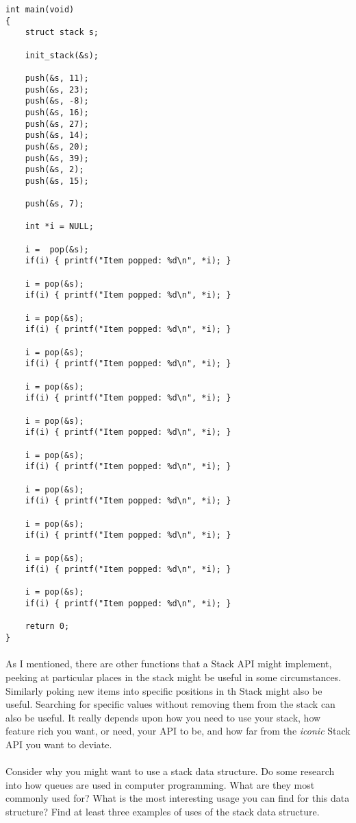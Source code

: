 \documentclass[10pt, a4paper, twosize]{article}
\begin{document}
\begin{lstlisting}
int main(void)
{
    struct stack s;

    init_stack(&s);

    push(&s, 11);
    push(&s, 23);
    push(&s, -8);
    push(&s, 16);
    push(&s, 27);
    push(&s, 14);
    push(&s, 20);
    push(&s, 39);
    push(&s, 2);
    push(&s, 15);
    
    push(&s, 7);

    int *i = NULL;

    i =  pop(&s);
    if(i) { printf("Item popped: %d\n", *i); }

    i = pop(&s);
    if(i) { printf("Item popped: %d\n", *i); }

    i = pop(&s);
    if(i) { printf("Item popped: %d\n", *i); }
    
    i = pop(&s);
    if(i) { printf("Item popped: %d\n", *i); }

    i = pop(&s);
    if(i) { printf("Item popped: %d\n", *i); }

    i = pop(&s);
    if(i) { printf("Item popped: %d\n", *i); }

    i = pop(&s);
    if(i) { printf("Item popped: %d\n", *i); }

    i = pop(&s);
    if(i) { printf("Item popped: %d\n", *i); }

    i = pop(&s);
    if(i) { printf("Item popped: %d\n", *i); }

    i = pop(&s);
    if(i) { printf("Item popped: %d\n", *i); }

    i = pop(&s);
    if(i) { printf("Item popped: %d\n", *i); }

    return 0;
}
\end{lstlisting}

\paragraph{} As I mentioned, there are other functions that a Stack API might implement, peeking at particular places in the stack might be useful in some circumstances. Similarly poking new items into specific positions in th Stack might also be useful. Searching for specific values without removing them from the stack can also be useful. It really depends upon how you need to use your stack, how feature rich you want, or need, your API to be, and how far from the \emph{iconic} Stack API you want to deviate.


\paragraph{} Consider why you might want to use a stack data structure. Do some research into how queues are used in computer programming. What are they most commonly used for? What is the most interesting usage you can find for this data structure? Find at least three examples of uses of the stack data structure.
\end{document}
